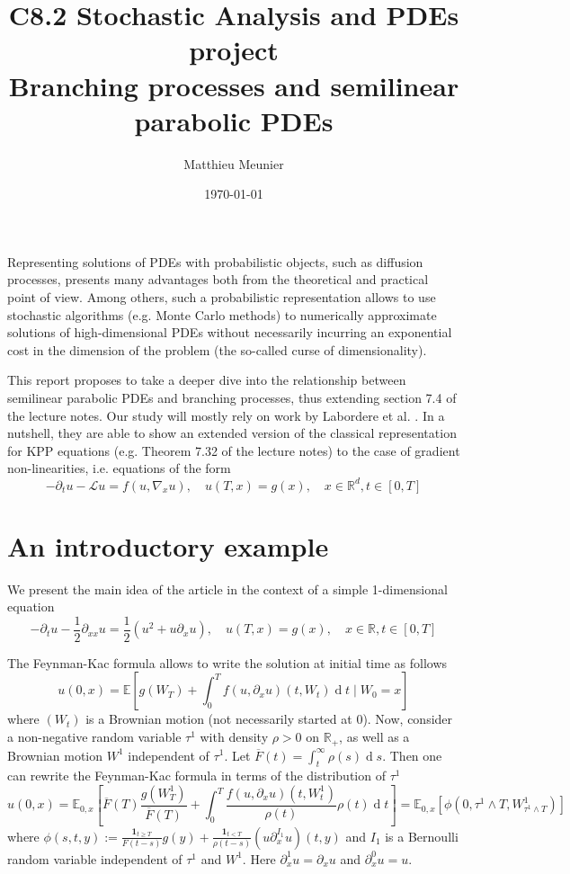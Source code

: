 \documentclass[11pt]{article}
\title{C8.2 Stochastic Analysis and PDEs project \\ Branching processes and semilinear parabolic PDEs}
\author{Matthieu Meunier}
\date{\today}
\newcommand{\R}{\mathbb{R}}
\renewcommand{\geq}{\geqslant}
\newcommand{\diff}{\ensuremath{\operatorname{d}\!}}
\theoremstyle{definition}
\theoremstyle{remark}
\begin{document}
\maketitle

Representing solutions of PDEs with probabilistic objects, such as diffusion processes, presents many advantages both from the theoretical and practical point of view. Among others, such a probabilistic representation allows to use stochastic algorithms (e.g. Monte Carlo methods) to numerically approximate solutions of high-dimensional PDEs without necessarily incurring an exponential cost in the dimension of the problem (the so-called curse of dimensionality).

This report proposes to take a deeper dive into the relationship between semilinear parabolic PDEs and branching processes, thus extending section 7.4 of the lecture notes. Our study will mostly rely on work by Labordere et al. \cite{labordere2019branching}. In a nutshell, they are able to show an extended version of the classical representation for KPP equations (e.g. Theorem 7.32 of the lecture notes) to the case of gradient non-linearities, i.e. equations of the form 
 \[
 - \partial_t u - \mathcal L u = f(u, \nabla_x u), \quad u(T,x) = g(x), \quad x \in \R ^{d}, t \in [0,T]
 \]

 \section{An introductory example}
 \label{section:intro}
We present the main idea of the article in the context of a simple 1-dimensional equation 
 \begin{equation}
	 \label{eq:pde-example}
	 - \partial_t u - \frac{1}{2}\partial_{xx} u = \frac{1}{2}(u ^{2} + u \partial_x u), \quad u(T,x) = g(x), \quad x \in \R, t \in [0,T]
 \end{equation}

The Feynman-Kac formula allows to write the solution at initial time as follows
 \[
 u(0,x) = \mathbb E \left[ g(W_T) + \int_{0}^{T} f(u, \partial_x u)(t,W_t) \diff t \mid W_0 = x \right]
 \]
 where $(W_t)$ is a Brownian motion (not necessarily started at $0$). Now, consider a non-negative random variable $\tau ^{1}$ with density $\rho > 0$ on $\R_+$, as well as a Brownian motion $W ^{1}$ independent of $\tau ^{1}$. Let $\overline{F}(t) = \int_{t}^{\infty} \rho(s) \diff s$. Then one can rewrite the Feynman-Kac formula in terms of the distribution of $\tau ^{1}$
 \[
	 u(0,x) = \mathbb E _{0,x} \left[ \overline{F}(T) \frac{g(W_T ^{1})}{\overline{F}(T)} + \int_{0}^{T} \frac{f(u,\partial_x u)(t,W ^{1}_t)}{\rho(t)}\rho(t) \diff t \right] = \mathbb E _{0,x} \left[ \phi(0,\tau ^{1} \wedge T, W ^{1}_{\tau ^{1} \wedge T}) \right]
 \]
 where $\phi(s,t,y) := \frac{\mathbf{1} _{t \geq T}}{F(t - s)}g(y) + \frac{\mathbf{1} _{t < T}}{\rho(t - s)}(u \partial_x ^{I_1} u)(t,y)$ and $I_1$ is a Bernoulli random variable independent of $\tau ^1$ and $W ^{1}$. Here $\partial_x ^{1} u  = \partial_x u$ and $\partial_x ^{0}u = u$.
\end{document}
